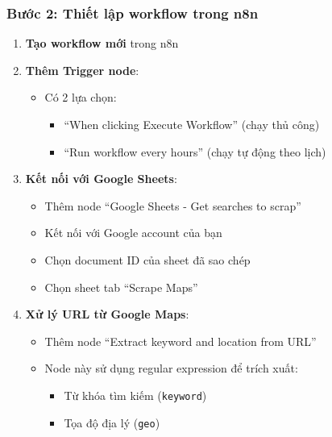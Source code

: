 \subsubsection{Bước 2: Thiết lập workflow trong n8n}

\begin{enumerate}
  \item \textbf{Tạo workflow mới} trong n8n

  \item \textbf{Thêm Trigger node}:
  \begin{itemize}
    \item Có 2 lựa chọn:
    \begin{itemize}
      \item ``When clicking Execute Workflow'' (chạy thủ công)
      \item ``Run workflow every hours'' (chạy tự động theo lịch)
    \end{itemize}
  \end{itemize}

  \item \textbf{Kết nối với Google Sheets}:
  \begin{itemize}
    \item Thêm node ``Google Sheets - Get searches to scrap''
    \item Kết nối với Google account của bạn
    \item Chọn document ID của sheet đã sao chép
    \item Chọn sheet tab ``Scrape Maps''
  \end{itemize}

  \item \textbf{Xử lý URL từ Google Maps}:
  \begin{itemize}
    \item Thêm node ``Extract keyword and location from URL''
    \item Node này sử dụng regular expression để trích xuất:
    \begin{itemize}
      \item Từ khóa tìm kiếm (\texttt{keyword})
      \item Tọa độ địa lý (\texttt{geo})
    \end{itemize}
  \end{itemize}


\end{enumerate}
